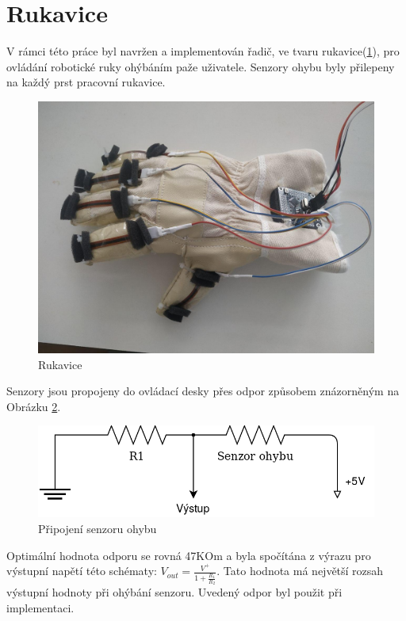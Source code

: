 \documentclass[thesis=B,czech]{FITthesis}[2012/06/26]
\begin{document}
\section{Rukavice}

V rámci této práce byl navržen a implementován řadič, ve tvaru rukavice(\ref{fig:gloveFoto}), pro ovládání robotické ruky ohýbáním paže uživatele. Senzory ohybu byly přilepeny na každý prst pracovní rukavice.

 \begin{figure}[h]
\centering
\includegraphics[scale=0.33]{./image/glove.jpg}
\caption{Rukavice}
\label{fig:gloveFoto}
\end{figure} 

Senzory jsou propojeny do ovládací desky přes odpor způsobem znázorněným na Obrázku \ref{fig:flexSensConn}. 

 \begin{figure}[h]
\centering
\includegraphics[scale=0.37]{./image/flexSensConn.png}
\caption{Připojení senzoru ohybu}
\label{fig:flexSensConn}
\end{figure} 

Optimální hodnota odporu se rovná 47KOm a byla spočítána z výrazu pro výstupní napětí této schématy: $V_{out} = \frac{V^+}{1 + \frac{R_1}{R_2}}$. Tato hodnota má největší rozsah výstupní hodnoty při ohýbání senzoru. Uvedený odpor byl použit při implementaci.
\end{document}
